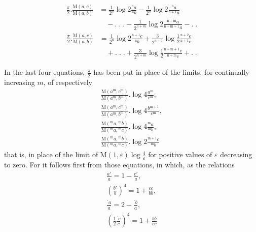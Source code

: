 \[
\begin{aligned}\displaystyle\frac\pi2.\frac{\mathrm{M}(a,c)}{\mathrm{M}(a,b)}&\displaystyle=\frac1{2^n}\log2\frac{{}^{\mathrm{n}}a}{{}^{\mathrm{n}}b}-\frac1{2^n}\log2\frac{{}^{\mathrm{n}}a}{{}^{\mathrm{n}+1}a}\\&\quad-.\;.\;.-\frac1{2^{n+m}}\log2\frac{{}^{\mathrm{n}+\mathrm{m}}a}{{}^{\mathrm{n}+\mathrm{m}+1}a}-.\;.\end{aligned}
\]
\[
\begin{aligned}\displaystyle\frac\pi2.\frac{\mathrm{M}(a,c)}{\mathrm{M}(a,b)}&\displaystyle=\frac1{2^n}\log2\frac{{}^{\mathrm{n}+1}c}{{}^{\mathrm{n}}b}+\frac3{2^{n+1}}\log\frac12\frac{{}^{\mathrm{n}+2}c}{{}^{\mathrm{n}+1}c}\\&\quad+.\;.\;.+\frac3{2^{n+m}}\log\frac12\frac{{}^{\mathrm{n}+\mathrm{m}+1}c}{{}^{\mathrm{n}+\mathrm{m}}c}+.\;.\end{aligned}
\]
\par In the last four equations, $\frac\pi2$ has been put in place of the limits, for continually increasing $m$, of respectively
\[
\begin{gathered}\frac{\mathrm{M}(a^{\mathrm{m}},c^{\mathrm{m}})}{\mathrm{M}(a^{\mathrm{m}},b^{\mathrm{m}})}.\log4\frac{a^{\mathrm{m}}}{c^{\mathrm{m}}};\\[9pt]
\frac{\mathrm{M}(a^{\mathrm{m}},c^{\mathrm{m}})}{\mathrm{M}(a^{\mathrm{m}},b^{\mathrm{m}})}.\log4\frac{b^{\mathrm{m}+1}}{c^{\mathrm{m}}},\\[9pt]
\frac{\mathrm{M}({}^{\mathrm{m}}a,{}^{\mathrm{m}}b)}{\mathrm{M}({}^{\mathrm{m}}a,{}^{\mathrm{m}}c)}.\log4\frac{{}^{\mathrm{m}}a}{{}^{\mathrm{m}}b},\\[9pt]
\frac{\mathrm{M}({}^{\mathrm{m}}a,{}^{\mathrm{m}}b)}{\mathrm{M}({}^{\mathrm{m}}a,{}^{\mathrm{m}}c)}.\log2\frac{{}^{\mathrm{m}+1}c}{{}^{\mathrm{m}}b}\end{gathered}
\]
that is, in place of the limit of $\mathrm{M}(1,\varepsilon)\log\frac4\varepsilon$ for positive values of $\varepsilon$ decreasing to zero. For it follows first from those equations, in which, as the relations
\[
\begin{gathered}\frac{a'}a=1-\frac{c'}a,\\[7pt]
\left(\frac{b'}b\right)^4=1+\frac{cc}{bb},\\[7pt]
\frac{{}^\prime a}a=2-\frac{{}^\prime b}a,\\[7pt]
\left(\frac12\frac{{}^\prime c}c\right)^4=1+\frac{bb}{cc}\end{gathered}
\]
